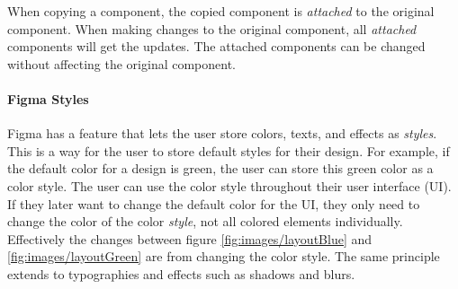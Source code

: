 When copying a component, the copied component is \textit{attached} to the original component. When making changes to the original component, all \textit{attached} components will get the updates. The attached components can be changed without affecting the original component. 

\paragraph{Figma Styles}%
\label{ssub:Styles}

Figma has a feature that lets the user store colors, texts, and effects as \textit{styles}. This is a way for the user to store default styles for their design.  For example, if the default color for a design is green, the user can store this green color as a color style. The user can use the color style throughout their user interface (UI). If they later want to change the default color for the UI, they only need to change the color of the color \textit{style}, not all colored elements individually. Effectively the changes between figure \ref{fig:images/layoutBlue} and \ref{fig:images/layoutGreen} are from changing the color style. The same principle extends to typographies and effects such as shadows and blurs. 

